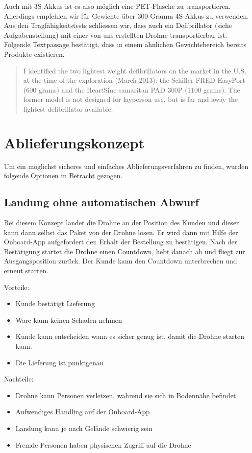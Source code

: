 Auch mit 3S Akkus ist es also möglich eine PET-Flasche zu transportieren. Allerdings empfehlen wir für Gewichte über 300 Gramm 4S-Akkus zu verwenden.\\


Aus den Tragfähigkeitstests schliessen wir, dass auch ein Defibrillator (siehe Aufgabenstellung) mit einer von uns erstellten Drohne transportierbar ist. Folgende Textpassage \cite[p.3]{FleckUAV} bestätigt, dass in einem ähnlichen Gewichtsbereich bereits Produkte existieren.

\blockquote{I identified the two lightest weight defibrillators on the market in the U.S. at the time of the exploration (March 2013): the Schiller FRED EasyPort (600 grams) and the HeartSine samaritan PAD 300P (1100 grams). The former model is not designed for layperson use, but is far and away the lightest defibrillator available.} 

\section{Ablieferungskonzept}

Um ein möglichst sicheres und einfaches Ablieferungsverfahren zu finden, wurden folgende Optionen in Betracht gezogen.

\subsection{Landung ohne automatischen Abwurf}

Bei diesem Konzept landet die Drohne an der Position des Kunden und dieser kann dann selbst das Paket von der Drohne lösen. Er wird dann mit Hilfe der Onboard-App aufgefordert den Erhalt der Bestellung zu bestätigen. Nach der Bestätigung startet die Drohne einen Countdown, hebt danach ab und fliegt zur Ausgangsposition zurück. Der Kunde kann den Countdown unterbrechen und erneut starten.

Vorteile:
\begin{itemize}
	\item Kunde bestätigt Lieferung
	\item Ware kann keinen Schaden nehmen
	\item Kunde kann entscheiden wann es sicher genug ist, damit die Drohne starten kann.
	\item Die Lieferung ist punktgenau 
\end{itemize}


Nachteile:
\begin{itemize}
	\item Drohne kann Personen verletzen, während sie sich in Bodennähe befindet
	\item Aufwendiges Handling auf der Onboard-App
	\item Landung kann je nach Gelände schwierig sein 
	\item Fremde Personen haben physischen Zugriff auf die Drohne
\end{itemize}

